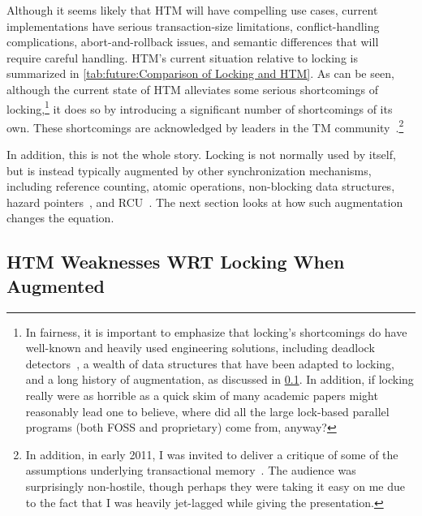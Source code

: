 

Although it seems likely that HTM will have compelling use cases,
current implementations have serious transaction-size limitations,
conflict-handling complications, abort-and-rollback issues, and
semantic differences that will require careful handling.
HTM's current situation relative to locking is summarized in
\cref{tab:future:Comparison of Locking and HTM}.
As can be seen, although the current state of HTM alleviates some
serious shortcomings of locking,\footnote{
	In fairness, it is important to emphasize that locking's shortcomings
	do have well-known and heavily used engineering solutions, including
	deadlock detectors~\cite{JonathanCorbet2006lockdep}, a wealth
	of data structures that have been adapted to locking, and
	a long history of augmentation, as discussed in
	\cref{sec:future:HTM Weaknesses WRT Locking When Augmented}.
	In addition, if locking really were as horrible as a quick skim
	of many academic papers might reasonably lead one to believe,
	where did all the large lock-based parallel programs (both
	FOSS and proprietary) come from, anyway?}
it does so by introducing a significant
number of shortcomings of its own.
These shortcomings are acknowledged by leaders in the TM
community~\cite{AlexanderMatveev2012PessimisticTM}.\footnote{
	In addition, in early 2011, I was invited to deliver a critique of
	some of the assumptions underlying transactional
	memory~\cite{PaulEMcKenney2011Verico}.
	The audience was surprisingly non-hostile, though perhaps they
	were taking it easy on me due to the fact that I was heavily
	jet-lagged while giving the presentation.}

In addition, this is not the whole story.
Locking is not normally used by itself, but is instead typically
augmented by other synchronization mechanisms,
including reference counting, atomic operations, non-blocking data structures,
hazard pointers~\cite{MagedMichael04a,HerlihyLM02},
and RCU~\cite{McKenney98,McKenney01a,ThomasEHart2007a,PaulEMcKenney2012ELCbattery}.
The next section looks at how such augmentation changes the equation.

\subsection{HTM Weaknesses WRT Locking When Augmented}
\label{sec:future:HTM Weaknesses WRT Locking When Augmented}



